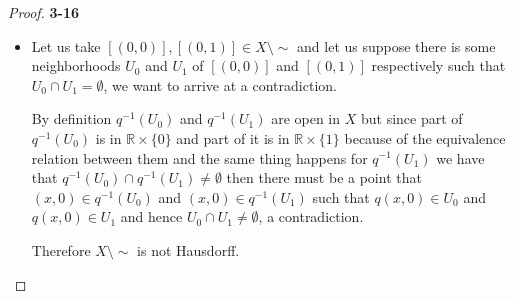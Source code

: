 \documentclass[11pt]{article}
\newcommand{\R}{\mathbb{R}}
\newcommand{\setmin}{\setminus}
\theoremstyle{definition}
\begin{document}
\begin{proof}{\textbf{3-16}}
\begin{itemize}
        Let us suppose we take a ball $B$ from the countable basis of
        $\R \times \{0\}$ then $q^{-1}(q(B))$ will contain the two balls
        from $\R \times \{0\}$ and $\R \times \{1\}$ and hence it's open
        which implies that $q(B)$ is open in $X\setmin\sim$ so 
        we can take the set of $\mathcal{B}' = \{q(B): B \in \mathcal{B}\}$
        as a countable basis for $X\setmin\sim$ and therefore 
        $X\setmin\sim$ is second countable.
\cleardoublepage
        \item
        Let us take $[(0,0)], [(0,1)] \in X\setmin\sim$ and let us suppose
        there is some neighborhoods $U_0$ and $U_1$ of $[(0,0)]$ and $[(0,1)]$
        respectively such that $U_0 \cap U_1 = \emptyset$, we want to arrive
        at a contradiction.

        By definition $q^{-1}(U_0)$ and $q^{-1}(U_1)$ are open in $X$
        but since part of $q^{-1}(U_0)$ is in $\R \times \{0\}$ and part of
        it is in $\R \times \{1\}$ because of the equivalence relation between
        them and the same thing happens for $q^{-1}(U_1)$ we have that
        $q^{-1}(U_0) \cap q^{-1}(U_1) \neq \emptyset$ then there must be a
        point that $(x,0) \in q^{-1}(U_0)$ and $(x,0) \in q^{-1}(U_1)$
        such that $q(x,0) \in U_0$ and $q(x,0) \in U_1$ and hence
        $U_0 \cap U_1 \neq \emptyset$, a contradiction.
        
        Therefore $X\setmin\sim$ is not Hausdorff.
    \end{itemize}
\end{proof}
\end{document}
